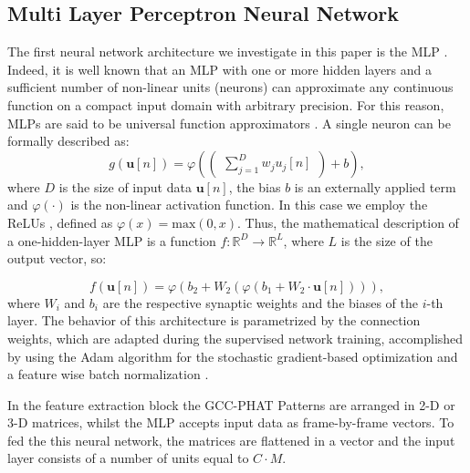 \documentclass[review]{elsarticle}
\begin{document}
\subsection{Multi Layer Perceptron Neural Network}
\label{sec:MLP}
The first neural network architecture we investigate in this paper is the MLP \cite{Rumelhart86-LRB}. Indeed, it is well known that an  MLP with one or more hidden layers and a sufficient number of non-linear units (neurons) can  approximate any continuous  function  on  a  compact  input  domain  with arbitrary precision. For this reason, MLPs are said to be universal function approximators \cite{hornik1989multilayer}. A single neuron can be formally described as:
\begin{equation}
g(\mathbf{u}[n])=\varphi \left(\left(\begin{matrix} \sum _{ j=1 }^{ D }{w_j u_j[n] }  \end{matrix} \right) + b\right),
\end{equation}
where $D$ is the size of input data $\mathbf{u}[n]$, the bias $b$ is an externally applied term and $\varphi(\cdot)$ is the non-linear activation function. In this case we employ the ReLUs \cite{nair2010rectified}, defined as $\varphi(x) = \text{max}(0,x)$.
Thus, the mathematical description of a one-hidden-layer MLP is a function $f:\mathbb{R}^D \rightarrow \mathbb{R}^L$, where $L$ is the size of the output vector, so:

\begin{equation}
f(\mathbf{u}[n]) = 	\varphi \left( b_2 + W_2 \left( \varphi \left( b_1 + W_2 \cdot \mathbf{u}[n]\right) \right) \right),
\end{equation}
where $W_i$ and $b_{i}$ are the respective synaptic weights and the biases of the $i$-th layer.
The  behavior  of  this architecture  is  parametrized  by  the connection weights, which are adapted during the supervised network training, accomplished by using the Adam algorithm \cite{kingma2014adam} for the stochastic gradient-based optimization and a feature wise batch normalization \cite{ioffe2015batch}.

In the feature extraction block the GCC-PHAT Patterns are arranged in 2-D or 3-D matrices, whilst the MLP accepts input data as frame-by-frame vectors. To fed the this neural network, the matrices are flattened in a vector and the input layer consists of a number of units equal to $C\cdot M$.
\end{document}
